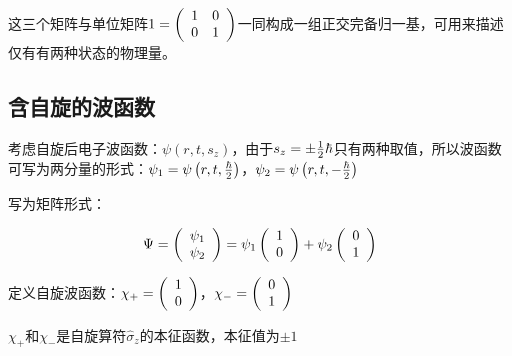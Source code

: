 这三个矩阵与单位矩阵$1 = \left( {\begin{array}{*{20}c}
   1 & 0  \\
   0 & 1  \\
\end{array}} \right)$一同构成一组正交完备归一基，可用来描述仅有有两种状态的物理量。


\subsection{含自旋的波函数}


考虑自旋后电子波函数：$\psi \left( {r,t,s_z } \right)$，由于$s_z  =  \pm {\textstyle{1 \over 2}}\hbar $只有两种取值，所以波函数可写为两分量的形式：$\psi _1  = \psi \left( {r,t,{\textstyle{\hbar  \over 2}}} \right)$，$\psi _2  = \psi \left( {r,t, - {\textstyle{\hbar  \over 2}}} \right)$



写为矩阵形式：


\begin{equation}\label{28-6-1}
\Psi  = \left( {\begin{array}{*{20}c}
   {\psi _1 }  \\
   {\psi _2 }  \\
\end{array}} \right) = \psi _1 \left( {\begin{array}{*{20}c}
   1  \\
   0  \\
\end{array}} \right) + \psi _2 \left( {\begin{array}{*{20}c}
   0  \\
   1  \\
\end{array}} \right)
\end{equation}

定义自旋波函数：$\chi _ +   = \left( {\begin{array}{*{20}c}
   1  \\
   0  \\
\end{array}} \right)$，$\chi _ -   = \left( {\begin{array}{*{20}c}
   0  \\
   1  \\
\end{array}} \right)$

$\chi_+$和$\chi_-$是自旋算符$\hat \sigma_z$的本征函数，本征值为$\pm 1$


